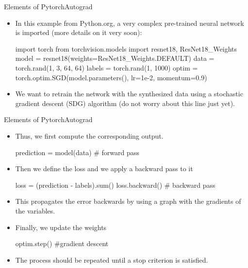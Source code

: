 \documentclass{beamer}
\begin{document}
\begin{frame}[fragile]{Elements of Pytorch}{Autograd}
\begin{itemize}
\item In this example from Python.org, a very complex pre-trained neural network is imported (more details on it very soon):

\begin{python}
import torch
from torchvision.models import resnet18, ResNet18_Weights
model  = resnet18(weights=ResNet18_Weights.DEFAULT)
data   = torch.rand(1, 3, 64, 64)
labels = torch.rand(1, 1000)
optim = torch.optim.SGD(model.parameters(), lr=1e-2, momentum=0.9)
\end{python}
\item We want to retrain the network with the synthesized data using a stochastic gradient descent (SDG) algorithm (do not worry about this line just yet). 
\end{itemize}
\end{frame}

\begin{frame}[fragile]{Elements of Pytorch}{Autograd}
\begin{itemize}
\item Thus, we first compute the corresponding output.
\begin{python}
prediction = model(data) # forward pass
\end{python}
\item Then we define the loss and we apply a backward pass to it
\begin{python}
loss = (prediction - labels).sum()
loss.backward() # backward pass
\end{python}
\item This propagates the error backwards by using a graph with the gradients of the variables. 
\item Finally, we update the weights
\begin{python}
 optim.step() #gradient descent   
\end{python}
\item The process should be repeated until a stop criterion is satisfied.
\end{itemize}
\end{frame}
\end{document}
